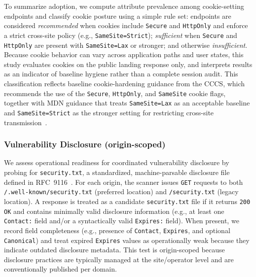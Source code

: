 \documentclass[a4paper,fleqn]{cas-sc}
\begin{document}
    To summarize adoption, we compute attribute prevalence among cookie-setting endpoints and classify cookie posture using a simple rule set: endpoints are considered \emph{recommended} when cookies include \texttt{Secure} and \texttt{HttpOnly} and enforce a strict cross-site policy (e.g., \texttt{SameSite=Strict}); \emph{sufficient} when \texttt{Secure} and \texttt{HttpOnly} are present with \texttt{SameSite=Lax} or stronger; and otherwise \emph{insufficient}. 
    Because cookie behavior can vary across application paths and user states, this study evaluates cookies on the public landing response only, and interprets results as an indicator of baseline hygiene rather than a complete session audit.
    This classification reflects baseline cookie-hardening guidance from the CCCS, which recommends the use of the \texttt{Secure}, \texttt{HttpOnly}, and \texttt{SameSite} cookie flags, together with MDN guidance that treats \texttt{SameSite=Lax} as an acceptable baseline and \texttt{SameSite=Strict} as the stronger setting for restricting cross-site transmission~\cite{cccs-itsm-60005, mdn_secure_cookie_configuration}.


\subsubsection{Vulnerability Disclosure (origin-scoped)}\label{sec:securitytxt}
    We assess operational readiness for coordinated vulnerability disclosure by probing for \texttt{security.txt}, a standardized, machine-parsable disclosure file defined in RFC~9116~\cite{rfc9116}. 
    For each origin, the scanner issues \texttt{GET} requests to both \texttt{/.well-known/security.txt} (preferred location) and \texttt{/security.txt} (legacy location). 
    A response is treated as a candidate \texttt{security.txt} file if it returns \texttt{200 OK} and contains minimally valid disclosure information (e.g., at least one \texttt{Contact:} field and/or a syntactically valid \texttt{Expires:} field). 
    When present, we record field completeness (e.g., presence of \texttt{Contact}, \texttt{Expires}, and optional \texttt{Canonical}) and treat expired \texttt{Expires} values as operationally weak because they indicate outdated disclosure metadata. 
    This test is origin-scoped because disclosure practices are typically managed at the site/operator level and are conventionally published per domain.
\end{document}
